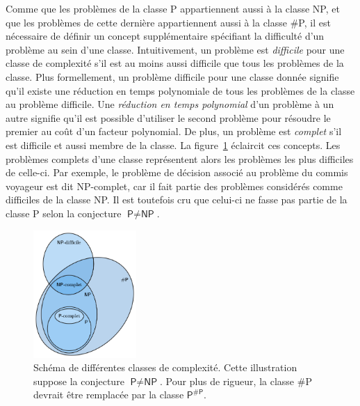 Comme que les problèmes de la classe \textsf{P} appartiennent aussi à la classe \textsf{NP}, et que les problèmes de cette dernière appartiennent aussi à la classe \textsf{\#P}, il est nécessaire de définir un concept supplémentaire spécifiant la difficulté d'un problème au sein d'une classe. Intuitivement, un problème est \textit{difficile} pour une classe de complexité s'il est au moins aussi difficile que tous les problèmes de la classe. Plus formellement, un problème difficile pour une classe donnée signifie qu'il existe une réduction en temps polynomiale de tous les problèmes de la classe au problème difficile. Une \textit{réduction en temps polynomial} d'un problème à un autre signifie qu'il est possible d'utiliser le second problème pour résoudre le premier au coût d'un facteur polynomial. De plus, un problème est \textit{complet} s'il est difficile et aussi membre de la classe. La figure~\ref{fig:complexity-classes} éclaircit ces concepts. Les problèmes complets d'une classe représentent alors les problèmes les plus difficiles de celle-ci. Par exemple, le problème de décision associé au problème du commis voyageur est dit \textsf{NP}-complet, car il fait partie des problèmes considérés comme difficiles de la classe \textsf{NP}. Il est toutefois cru que celui-ci ne fasse pas partie de la classe \textsf{P} selon la conjecture $\textsf{P} \neq \textsf{NP}$.

\begin{figure}[h]
    \centering
    \includegraphics[width=0.35\textwidth]{figures/complexity-classes.png}
    \caption[Classes de complexité]{Schéma de différentes classes de complexité. Cette illustration suppose la conjecture $\textsf{P} \neq \textsf{NP}$. Pour plus de rigueur, la classe \textsf{\#P} devrait être remplacée par la classe $\textsf{P}^{\textsf{\#P}}$.}
    \label{fig:complexity-classes}
\end{figure}

